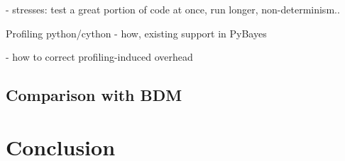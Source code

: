 \documentclass[a4paper,12pt,oneside]{report}
\newif\ifrelease %
\begin{document}
- stresses: test a great portion of code at once, run longer, non-determinism..

Profiling python/cython - how, existing support in PyBayes

- how to correct profiling-induced overhead

\section{Comparison with BDM}


\chapter*{Conclusion} 


\clearpage %



\ifrelease
	\appendix %
	\clearpage %
	\phantomsection %
	\addcontentsline{toc}{chapter}{\appendixname}

	\part*{\appendixname}

	
\fi
\end{document}
